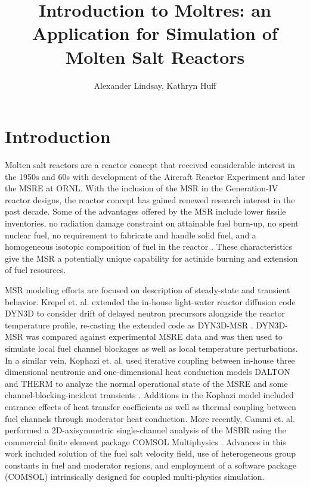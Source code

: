 \documentclass{article}
\title{Introduction to Moltres: an Application for Simulation of Molten Salt Reactors}
\author{Alexander Lindsay, Kathryn Huff}
\let\Oldsection\section
\renewcommand{\section}{\FloatBarrier\Oldsection}
\begin{document}
\maketitle

\section{Introduction}

Molten salt reactors are a reactor concept that received considerable interest
in the 1950s and 60s with development of the Aircraft Reactor Experiment and
later the \gls{MSRE} at \gls{ORNL}. With the inclusion of the \gls{MSR} in the
Generation-IV reactor designs, the reactor concept has gained renewed research
interest in the past decade. Some of the advantages offered by the \gls{MSR}
include lower fissile inventories, no radiation damage constraint on attainable
fuel burn-up, no spent nuclear fuel, no requirement to fabricate and handle
solid fuel, and a homogeneous isotopic composition of fuel in the
reactor \cite{noauthor_gen_2008}. These characteristics give the \gls{MSR} a
potentially unique capability for actinide burning and extension of fuel
resources.

\gls{MSR} modeling efforts are focused on description of steady-state and
transient behavior. Krepel et. al. extended the in-house light-water reactor
diffusion code DYN3D to consider drift of delayed neutron precursors alongside
the reactor temperature profile, re-casting the extended code as
DYN3D-MSR \cite{krepel_dyn3d-msr_2007}. DYN3D-MSR was compared against
experimental \gls{MSRE} data and was then used to simulate local fuel channel
blockages as well as local temperature perturbations. In a similar vein, Kophazi
et. al. used iterative coupling between in-house three dimensional neutronic and
one-dimensional heat conduction models DALTON and THERM to analyze the normal
operational state of the \gls{MSRE} and some channel-blocking-incident
transients \cite{kophazi_development_2009}. Additions in the Kophazi model
included entrance effects of heat transfer coefficients as well as thermal
coupling between fuel channels through moderator heat conduction. More recently,
Cammi et. al. performed a 2D-axisymmetric single-channel analysis of the
\gls{MSBR} using the commercial finite element package COMSOL
Multiphysics \cite{cammi_multi-physics_2011}. Advances in this work included
solution of the fuel salt velocity field, use of heterogeneous group constants
in fuel and moderator regions, and employment of a software package (COMSOL)
intrinsically designed for coupled multi-physics simulation.
\end{document}
